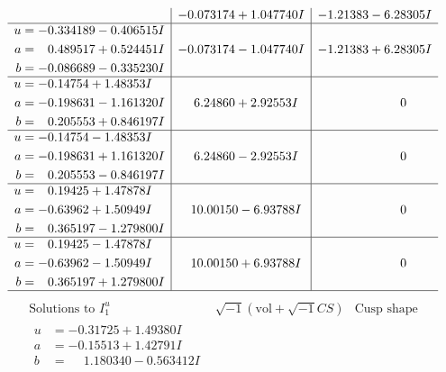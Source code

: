 \documentclass[1p]{elsarticle_modified}
\theoremstyle{definition}
\newcommand{\I}{\sqrt{-1}}
\begin{document}
$$\begin{array}{c|c|c}
 & -0.073174 + 1.047740 I & -1.21383 - 6.28305 I \\ \hline\begin{aligned}
u &= -0.334189 - 0.406515 I \\
a &= \phantom{-}0.489517 + 0.524451 I \\
b &= -0.086689 - 0.335230 I\end{aligned}
 & -0.073174 - 1.047740 I & -1.21383 + 6.28305 I \\ \hline\begin{aligned}
u &= -0.14754 + 1.48353 I \\
a &= -0.198631 - 1.161320 I \\
b &= \phantom{-}0.205553 + 0.846197 I\end{aligned}
 & \phantom{-}6.24860 + 2.92553 I & \phantom{-0.000000 } 0 \\ \hline\begin{aligned}
u &= -0.14754 - 1.48353 I \\
a &= -0.198631 + 1.161320 I \\
b &= \phantom{-}0.205553 - 0.846197 I\end{aligned}
 & \phantom{-}6.24860 - 2.92553 I & \phantom{-0.000000 } 0 \\ \hline\begin{aligned}
u &= \phantom{-}0.19425 + 1.47878 I \\
a &= -0.63962 + 1.50949 I \\
b &= \phantom{-}0.365197 - 1.279800 I\end{aligned}
 & \phantom{-}10.00150 - 6.93788 I & \phantom{-0.000000 } 0 \\ \hline\begin{aligned}
u &= \phantom{-}0.19425 - 1.47878 I \\
a &= -0.63962 - 1.50949 I \\
b &= \phantom{-}0.365197 + 1.279800 I\end{aligned}
 & \phantom{-}10.00150 + 6.93788 I & \phantom{-0.000000 } 0\\
 \hline 
 \end{array}$$\newpage$$\begin{array}{c|c|c}  
\text{Solutions to }I^u_{1}& \I (\text{vol} + \sqrt{-1}CS) & \text{Cusp shape}\\
 \hline 
\begin{aligned}
u &= -0.31725 + 1.49380 I \\
a &= -0.15513 + 1.42791 I \\
b &= \phantom{-}1.180340 - 0.563412 I\end{aligned}

\end{array}$$
\end{document}
